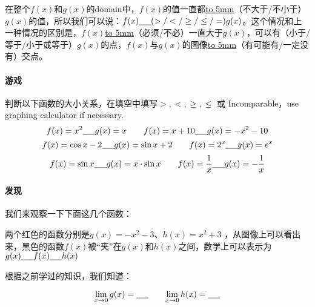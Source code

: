 \documentclass[UTF8]{ctexart}
\begin{document}
在整个$f(x)$和$g(x)$的domain中，$f(x)$的值一直都\underline{\hbox to 5mm{}}（不大于/不小于）$g(x)$的值，所以我们可以说：$f(x)\underline{\hbox to 5mm{}}(>/</\geq/\leq/=) g(x)$。这个情况和上一种情况的区别是，$f(x)$\underline{\hbox to 5mm{}}（必须/不必）一直大于$g(x)$，可以有（小于/等于/小于或等于）$g(x)$的点，$f(x)$与$g(x)$的图像\underline{\hbox to 5mm{}}（有可能有/一定没有）交点。

\paragraph{游戏}
判断以下函数的大小关系，在填空中填写$>,<,\geq,\leq$ 或 Incomparable，use graphing calculator if necessary.
\[f(x) = x^2\underline{\hbox to 5mm{}} g(x) =  x    \qquad   f(x) = x+10  \underline{\hbox to 5mm{}} g(x) = -x^2-10\]
\[f(x) =\cos{x}-2\underline{\hbox to 5mm{}} g(x) = \sin{x+2}    \qquad   f(x) = 2^x  \underline{\hbox to 5mm{}} g(x) = e^x\]
\[f(x) =\sin{x} \underline{\hbox to 5mm{}} g(x) = x\cdot \sin{x}    \qquad   f(x) = \frac{1}{x} \underline{\hbox to 5mm{}} g(x) = -\frac{1}{x}\]

\paragraph{发现}

我们来观察一下下面这几个函数：
\begin{center}
\end{center}
两个红色的函数分别是$g(x) = -x^2 - 3$、$h(x) = x^2+3$ ，从图像上可以看出来，黑色的函数$f(x)$被“夹”在$g(x)$和$h(x)$之间，数学上可以表示为$g(x)\underline{\hbox to 5mm{}}f(x)\underline{\hbox to 5mm{}}h(x)$

根据之前学过的知识，我们知道：

\[{\lim_{x \to 0} g(x)} = \underline{\hbox to 5mm{}} \qquad {\lim_{x \to 0} h(x)} = \underline{\hbox to 5mm{}} \]
\end{document}
